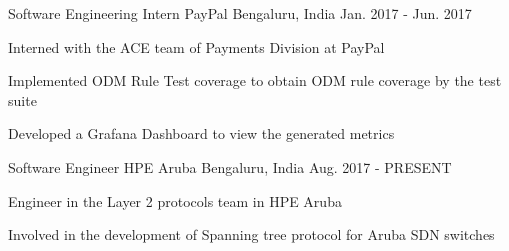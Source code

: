 

\begin{cventries}

  \cventry
    {Software Engineering Intern} %
    {PayPal} %
    {Bengaluru, India} %
    {Jan. 2017 - Jun. 2017} %
    {
      \begin{cvitems} %
        \item {Interned with the ACE team of Payments Division at PayPal}
        \item {Implemented ODM Rule Test coverage to obtain ODM rule coverage by the test suite}
        \item {Developed a Grafana Dashboard to view the generated metrics}
      \end{cvitems}
    }

  \cventry
    {Software Engineer} %
    {HPE Aruba} %
    {Bengaluru, India} %
    {Aug. 2017 - PRESENT} %
    {
      \begin{cvitems} %
        \item {Engineer in the Layer 2 protocols team in HPE Aruba}
        \item {Involved in the development of Spanning tree protocol for Aruba SDN switches}
      \end{cvitems}
    }

\end{cventries}

